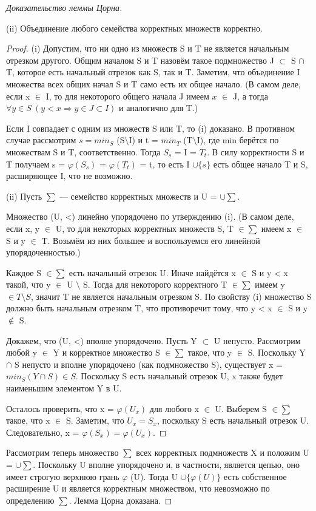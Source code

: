 \begin{proof}[Доказательство леммы Цорна]
\begin{lemma}
(ii) Объединение любого семейства корректных множеств корректно.
\end{lemma}

\begin{proof}
(i) Допустим, что ни одно из множеств S и T не является начальным отрезком другого. Общим началом S и T назовём такое подмножество J $\subset$ S $\cap$ T,  которое есть начальный отрезок как S, так и T. Заметим, что объединение I множества всех общих начал S и T само есть их общее начало. (В самом деле, если x $\in$ I, то для некоторого общего начала J имеем $x$ $\in$ J, а тогда $\forall y \in S \ (y < x \Rightarrow y \in J \subset I)$ и аналогично для T.)

Если I совпадает с одним из множеств S или T, то (i) доказано. В противном случае рассмотрим $s = min_S$ (S$\setminus$I) и t = $min_T$ (T$\setminus$I), где min берётся по множествам S и T, соответственно. Тогда $S_s$ = I = $T_t$. В силу корректности S и T получаем s = $\varphi (S_s)$ = $\varphi (T_t)$ = t, то есть I $\cup \{s\}$ есть общее начало T и S, расширяющее I, что не возможно.

(ii) Пусть $\sum$ — семейство корректных множеств и U = $\cup \sum$.

Множество (U, <) линейно упорядочено по утверждению (i). (В самом деле, если x, y $\in$ U, то для некоторых корректных множеств S, T $\in \sum$ имеем x $\in$ S и y $\in$ T. Возьмём из них большее и воспользуемся его линейной упорядоченностью.)

Каждое S $\in \sum$ есть начальный отрезок U. Иначе найдётся x $\in$ S и y < x такой, что y $\in$ U $\setminus$ S. Тогда для некоторого корректного T $\in \sum$ имеем y $\in T \setminus S$,  значит T не является начальным отрезком S. По свойству (i) множество S должно быть начальным отрезком T, что противоречит тому, что y < x $\in$ S и y $\notin$ S.

Докажем, что (U, <) вполне упорядочено. Пусть Y $\subset$ U непусто. Рассмотрим любой y $\in$ Y и корректное множество S $\in \sum$ такое, что y $\in$ S. Поскольку Y $\cap$ S непусто и вполне упорядочено (как подмножество S), существует x = $min_S (Y \cap S) \in S$. Поскольку S есть начальный отрезок U, x также будет наименьшим элементом Y в U.

Осталось проверить, что x = $\varphi (U_x)$ для любого x $\in$ U. Выберем S $\in \sum$ такое, что x $\in$ S. Заметим, что $U_x = S_x$, поскольку S есть начальный отрезок U. Следовательно, x = $\varphi (S_x) = \varphi (U_x)$.
\end{proof}

Рассмотрим теперь множество $\sum$ всех корректных подмножеств X и положим U = $\cup \sum$.  Поскольку U вполне упорядочено и, в частности, является цепью, оно имеет строгую верхнюю грань $\varphi$ (U). Тогда U $\cup \{\varphi (U) \}$ есть собственное расширение U и является корректным множеством, что невозможно по определению $\sum$. Лемма Цорна доказана.
\end{proof}